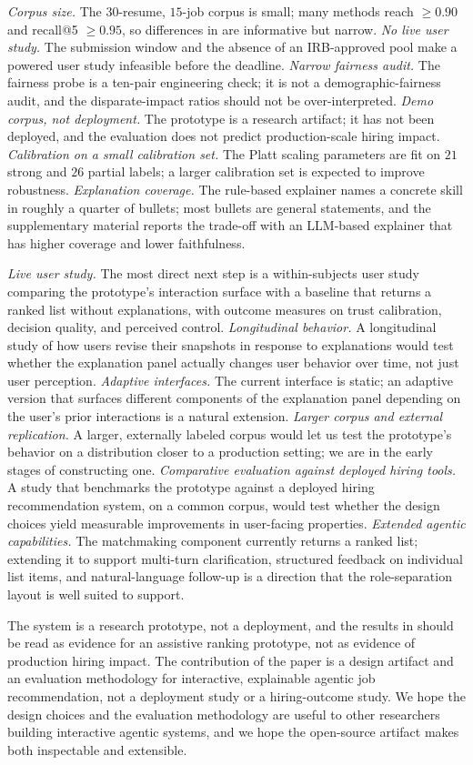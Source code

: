\emph{Corpus size.} The $30$-resume, $15$-job corpus is small; many methods reach \ndcg{} $\geq 0.90$ and recall@5 $\geq 0.95$, so differences in \ndcg{} are informative but narrow.
\emph{No live user study.} The submission window and the absence of an {IRB}-approved pool make a powered user study infeasible before the deadline.
\emph{Narrow fairness audit.} The fairness probe is a ten-pair engineering check; it is not a demographic-fairness audit, and the disparate-impact ratios should not be over-interpreted.
\emph{Demo corpus, not deployment.} The prototype is a research artifact; it has not been deployed, and the evaluation does not predict production-scale hiring impact.
\emph{Calibration on a small calibration set.} The Platt scaling parameters are fit on $21$ strong and $26$ partial labels; a larger calibration set is expected to improve robustness.
\emph{Explanation coverage.} The rule-based explainer names a concrete skill in roughly a quarter of bullets; most bullets are general statements, and the supplementary material reports the trade-off with an LLM-based explainer that has higher coverage and lower faithfulness.

\emph{Live user study.} The most direct next step is a within-subjects user study comparing the prototype's interaction surface with a baseline that returns a ranked list without explanations, with outcome measures on trust calibration, decision quality, and perceived control.
\emph{Longitudinal behavior.} A longitudinal study of how users revise their snapshots in response to explanations would test whether the explanation panel actually changes user behavior over time, not just user perception.
\emph{Adaptive interfaces.} The current interface is static; an adaptive version that surfaces different components of the explanation panel depending on the user's prior interactions is a natural extension.
\emph{Larger corpus and external replication.} A larger, externally labeled corpus would let us test the prototype's behavior on a distribution closer to a production setting; we are in the early stages of constructing one.
\emph{Comparative evaluation against deployed hiring tools.} A study that benchmarks the prototype against a deployed hiring recommendation system, on a common corpus, would test whether the design choices yield measurable improvements in user-facing properties.
\emph{Extended agentic capabilities.} The matchmaking component currently returns a ranked list; extending it to support multi-turn clarification, structured feedback on individual list items, and natural-language follow-up is a direction that the role-separation layout is well suited to support.

The system is a research prototype, not a deployment, and the results in  should be read as evidence for an assistive ranking prototype, not as evidence of production hiring impact.
The contribution of the paper is a design artifact and an evaluation methodology for interactive, explainable agentic job recommendation, not a deployment study or a hiring-outcome study.
We hope the design choices and the evaluation methodology are useful to other researchers building interactive agentic systems, and we hope the open-source artifact makes both inspectable and extensible.
